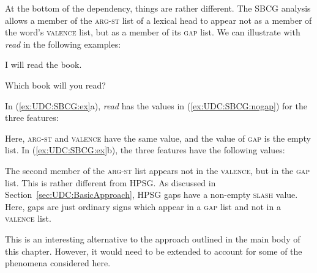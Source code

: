 \documentclass[output=paper
,notxmath 
 	        ,biblatex
                ,babelshorthands
                ,newtxmath
                ,draftmode
                ,colorlinks, citecolor=brown
]{langscibook}
\begin{document}
At the bottom of the dependency, things are rather different. The SBCG
analysis allows a member of the \textsc{arg-st} list of a lexical head
to appear not as a member of the word’s \textsc{valence} list, but as
a member of its \textsc{gap} list. We can illustrate with
\textit{read} in the following examples:

\begin{exe}
  \ex \label{ex:UDC:SBCG:ex}
  \begin{xlist}
    \ex I will read the book.
    
    \ex Which book will you read?
  \end{xlist}

\end{exe}

\noindent
In (\ref{ex:UDC:SBCG:ex}a), \textit{read} has the values in
(\ref{ex:UDC:SBCG:nogap}) for the three features:

\begin{exe}
  \ex \label{ex:UDC:SBCG:nogap}

\end{exe}

\noindent
Here, \textsc{arg-st} and \textsc{valence} have the same value, and
the value of \textsc{gap} is the empty list. In
(\ref{ex:UDC:SBCG:ex}b), the three features have the following values:

\begin{exe}
  \ex \label{ex:UDC:SBCG:gap}

\end{exe}
	
\noindent
The second member of the \textsc{arg-st} list appears not in the
\textsc{valence}, but in the \textsc{gap} list. This is rather
different from HPSG. As discussed in
Section~\ref{sec:UDC:BasicApproach}, HPSG gaps have a non-empty
\textsc{slash} value. Here, gaps are just ordinary signs which appear
in a \textsc{gap} list and not in a \textsc{valence} list.

This is an interesting alternative to the approach outlined in the
main body of this chapter. However, it would need to be extended to
account for some of the phenomena considered here.
\end{document}
